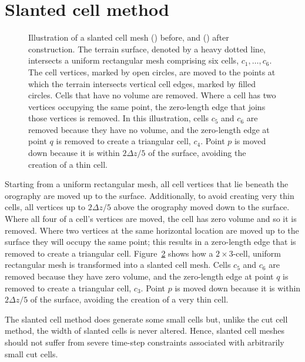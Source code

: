 \section{Slanted cell method}
\label{sec:slanted:method}

\begin{figure}
\centering
\begin{subfigure}{\textwidth}
	\centering
	
	\label{fig:slanted:construct-mesh:before}
	\label{fig:slanted:construct-mesh:after}
\end{subfigure}
\caption{Illustration of a slanted cell mesh
() before, and
() after construction.
	The terrain surface, denoted by a heavy dotted line, intersects a uniform rectangular mesh comprising six cells, $c_1, \ldots, c_6$.
	The cell vertices, marked by open circles, are moved to the points at which the terrain intersects vertical cell edges, marked by filled circles.  Cells that have no volume are removed.  Where a cell has two vertices occupying the same point, the zero-length edge that joins those vertices is removed.
	In this illustration, cells $c_5$ and $c_6$ are removed because they have no volume, and the zero-length edge at point $q$ is removed to create a triangular cell, $c_4$.
	Point $p$ is moved down because it is within $2 \Delta z/5$ of the surface, avoiding the creation of a thin cell.}
\label{fig:slanted:construct-mesh}
\end{figure}

Starting from a uniform rectangular mesh, all cell vertices that lie beneath the orography are moved up to the surface.
Additionally, to avoid creating very thin cells, all vertices up to $2 \Delta z/5$ above the orography  moved down to the surface.
Where all four of a cell's vertices are moved, the cell has zero volume and so it is removed.  Where two vertices at the same horizontal location are moved up to the surface they will occupy the same point; this results in a zero-length edge that is removed to create a triangular cell.
Figure~\ref{fig:slanted:construct-mesh} shows how a $2 \times 3$-cell, uniform rectangular mesh is transformed into a slanted cell mesh.  Cells $c_5$ and $c_6$ are removed because they have zero volume, and the zero-length edge at point $q$ is removed to create a triangular cell, $c_3$.
Point $p$ is moved down because it is within $2\Delta z/5$ of the surface, avoiding the creation of a very thin cell.

The slanted cell method does generate some small cells but, unlike the cut cell method, the width of slanted cells is never altered.  Hence, slanted cell meshes should not suffer from severe time-step constraints associated with arbitrarily small cut cells.

